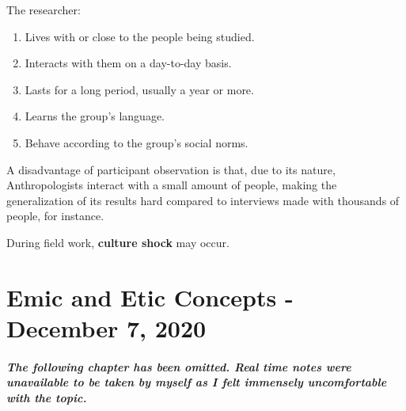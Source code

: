 \documentclass[11pt,a4paper]{book}
\begin{document}
The researcher:

\begin{enumerate}
\item Lives with or close to the people being studied.
\item Interacts with them on a day-to-day basis.
\item Lasts for a long period, usually a year or more.
\item Learns the group's language.
\item Behave according to the group's social norms.
\end{enumerate}

A disadvantage of participant observation is that, due to its nature, Anthropologists interact with a small amount of people, making the generalization of its results hard compared to interviews made with thousands of people, for instance.

During field work, \textbf{culture shock} may occur.

\chapter{Emic and Etic Concepts - December 7, 2020}

\paragraph{The following chapter has been omitted. Real time notes were unavailable to be taken by myself as I felt immensely uncomfortable with the topic.}\mbox{}\\
\end{document}
